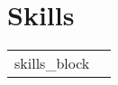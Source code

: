 \documentclass[a4paper,12pt]{article}
\begin{document}
\section{Skills}
\begin{tabularx}{\linewidth}{@{}l X@{}}	
{{skills_block}}
\end{tabularx}

\vfill
{}
\end{document}
